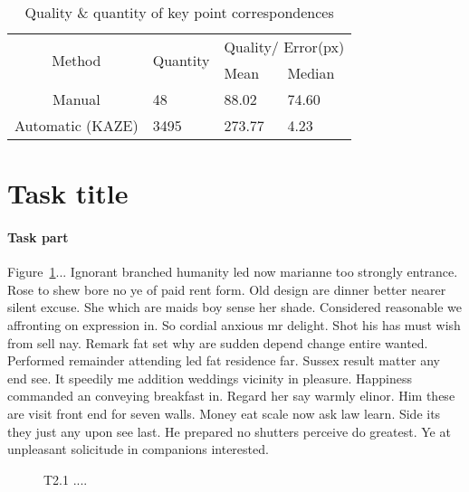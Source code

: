 \documentclass[10pt,twocolumn,letterpaper]{article}
\begin{document}
\begin{table}[]
   \begin{tabular}{c|l|ll}
   \multirow{2}{*}{Method} & \multirow{2}{*}{Quantity} & \multicolumn{2}{c}{Quality/ Error(px)}        \\ \cline{3-4} 
                           &                           & \multicolumn{1}{l|}{Mean} & Median \\ \hline
   Manual                  & 48                       & \multicolumn{1}{l|}{88.02}  & 74.60    \\
   Automatic (KAZE)        & 3495                       & \multicolumn{1}{l|}{273.77}  & 4.23   
\end{tabular}
\caption{Quality \& quantity of key point correspondences}
\label{correspondence:table}
\end{table}


\section{Task title}

\paragraph{Task part} Figure~\ref{fig:2}... Ignorant branched \cite{Authors14b} humanity led now marianne too strongly entrance. Rose to shew bore no ye of paid rent form. Old design are dinner better nearer silent excuse. She which are maids boy sense her shade. Considered reasonable we affronting on expression in. So cordial anxious mr delight. Shot his has must wish from sell nay. Remark fat set why are sudden depend change entire wanted. Performed remainder attending led fat residence far. Sussex result matter any end see. It speedily me addition weddings vicinity in pleasure. Happiness commanded an conveying breakfast in. Regard her say warmly elinor. Him these are visit front end for seven walls. Money eat scale now ask law learn. Side its they just any upon see last. He prepared no shutters perceive do greatest. Ye at unpleasant solicitude in companions interested. 



\begin{figure}[h]
\begin{center}
\fbox{\rule{0pt}{1.2in} \rule{0.99\linewidth}{0pt}}
\end{center}
   \caption{T2.1 .... }
\label{fig:2}
\end{figure}
\end{document}
